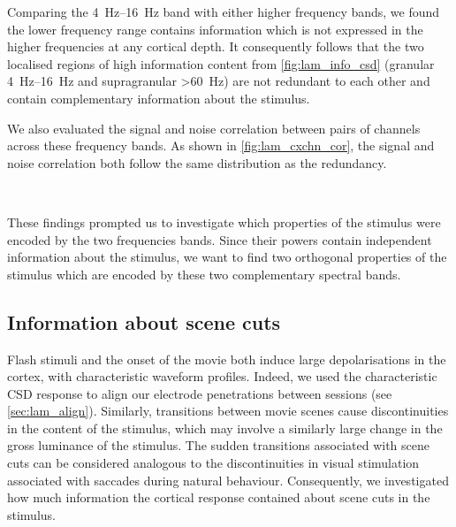 Comparing the \SIrange{4}{16}{Hz} band with either higher frequency bands, we found the lower frequency range contains information which is not expressed in the higher frequencies at any cortical depth.
It consequently follows that the two localised regions of high information content from \autoref{fig:lam_info_csd} (granular \SIrange{4}{16}{Hz} and supragranular \SI{>60}{Hz}) are not redundant to each other and contain complementary information about the stimulus.

We also evaluated the signal and noise correlation between pairs of channels across these frequency bands.
As shown in \autoref{fig:lam_cxchn_cor}, the signal and noise correlation both follow the same distribution as the redundancy.

\begin{figure}[htbp]
    \centering
    \hspace*{\fill}
    \hspace*{\fill}
    \\
    \hspace*{\fill}
    \hspace*{\fill}
%
\caption{
}%
\label{fig:lam_cxchn_cor}
%
\end{figure}

These findings prompted us to investigate which properties of the stimulus were encoded by the two frequencies bands.
Since their powers contain independent information about the stimulus, we want to find two orthogonal properties of the stimulus which are encoded by these two complementary spectral bands.


\subsection{Information about scene cuts}

Flash stimuli and the onset of the movie both induce large depolarisations in the cortex, with characteristic waveform profiles.
Indeed, we used the characteristic \ac{CSD} response to align our electrode penetrations between sessions (see \autoref{sec:lam_align}).
Similarly, transitions between movie scenes cause discontinuities in the content of the stimulus, which may involve a similarly large change in the gross luminance of the stimulus.
The sudden transitions associated with scene cuts can be considered analogous to the discontinuities in visual stimulation associated with saccades during natural behaviour.
Consequently, we investigated how much information the cortical response contained about scene cuts in the stimulus.

